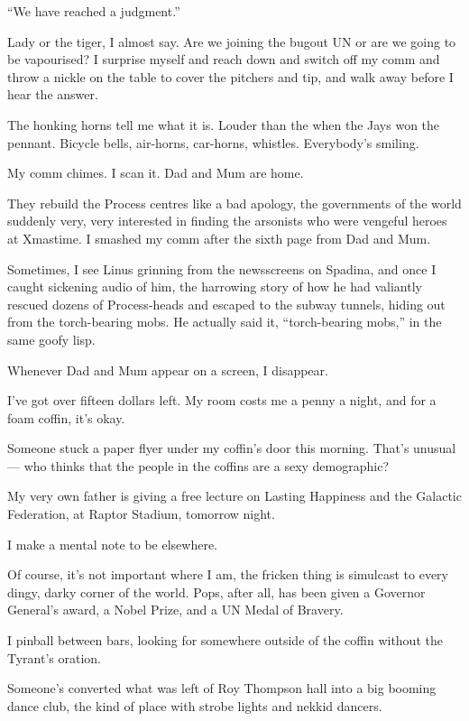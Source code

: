 ``We have reached a judgment.''

Lady or the tiger, I almost say. Are we joining the bugout UN or
are we going to be vapourised? I surprise myself and reach down and
switch off my comm and throw a nickle on the table to cover the
pitchers and tip, and walk away before I hear the answer.

The honking horns tell me what it is. Louder than the when the Jays
won the pennant. Bicycle bells, air-horns, car-horns, whistles.
Everybody's smiling.

My comm chimes. I scan it. Dad and Mum are home.

\tb

They rebuild the Process centres like a bad apology, the
governments of the world suddenly very, very interested in finding
the arsonists who were vengeful heroes at Xmastime. I smashed my
comm after the sixth page from Dad and Mum.

Sometimes, I see Linus grinning from the newsscreens on Spadina,
and once I caught sickening audio of him, the harrowing story of
how he had valiantly rescued dozens of Process-heads and escaped to
the subway tunnels, hiding out from the torch-bearing mobs. He
actually said it, ``torch-bearing mobs,'' in the same goofy lisp.

Whenever Dad and Mum appear on a screen, I disappear.

I've got over fifteen dollars left. My room costs me a penny a
night, and for a foam coffin, it's okay.

\tb

Someone stuck a paper flyer under my coffin's door this morning.
That's unusual --- who thinks that the people in the coffins are a
sexy demographic?

My very own father is giving a free lecture on Lasting Happiness
and the Galactic Federation, at Raptor Stadium, tomorrow night.

I make a mental note to be elsewhere.

Of course, it's not important where I am, the fricken thing is
simulcast to every dingy, darky corner of the world. Pops, after
all, has been given a Governor General's award, a Nobel Prize, and
a UN Medal of Bravery.

I pinball between bars, looking for somewhere outside of the coffin
without the Tyrant's oration.

Someone's converted what was left of Roy Thompson hall into a big
booming dance club, the kind of place with strobe lights and nekkid
dancers.

